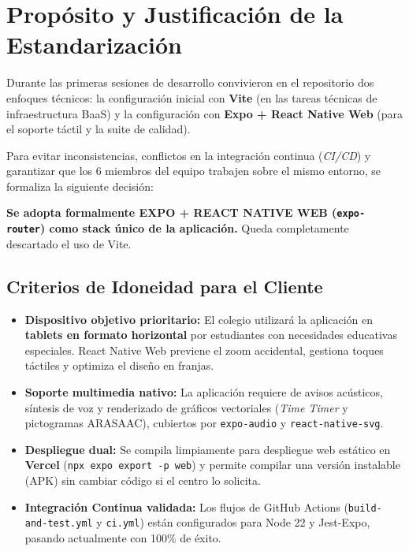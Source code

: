 \documentclass[11pt,a4paper]{article}
\begin{document}
\section{Propósito y Justificación de la Estandarización}

Durante las primeras sesiones de desarrollo convivieron en el repositorio dos enfoques técnicos: la configuración inicial con \textbf{Vite} (en las tareas técnicas de infraestructura BaaS) y la configuración con \textbf{Expo + React Native Web} (para el soporte táctil y la suite de calidad).

Para evitar inconsistencias, conflictos en la integración continua (\textit{CI/CD}) y garantizar que los 6 miembros del equipo trabajen sobre el mismo entorno, se formaliza la siguiente decisión:

\begin{tcolorbox}[colback=ggray,colframe=gblue,title=\textbf{Decisión Oficial de Equipo: Adopción de Expo + React Native Web}]
    \textbf{Se adopta formalmente EXPO + REACT NATIVE WEB (\texttt{expo-router}) como stack único de la aplicación.} Queda completamente descartado el uso de Vite.
\end{tcolorbox}

\subsection{Criterios de Idoneidad para el Cliente}
\begin{itemize}[leftmargin=*]
    \item \textbf{Dispositivo objetivo prioritario:} El colegio utilizará la aplicación en \textbf{tablets en formato horizontal} por estudiantes con necesidades educativas especiales. React Native Web previene el zoom accidental, gestiona toques táctiles y optimiza el diseño en franjas.
    \item \textbf{Soporte multimedia nativo:} La aplicación requiere de avisos acústicos, síntesis de voz y renderizado de gráficos vectoriales (\textit{Time Timer} y pictogramas ARASAAC), cubiertos por \texttt{expo-audio} y \texttt{react-native-svg}.
    \item \textbf{Despliegue dual:} Se compila limpiamente para despliegue web estático en \textbf{Vercel} (\texttt{npx expo export -p web}) y permite compilar una versión instalable (APK) sin cambiar código si el centro lo solicita.
    \item \textbf{Integración Continua validada:} Los flujos de GitHub Actions (\texttt{build-and-test.yml} y \texttt{ci.yml}) están configurados para Node 22 y Jest-Expo, pasando actualmente con 100\% de éxito.
\end{itemize}
\end{document}
